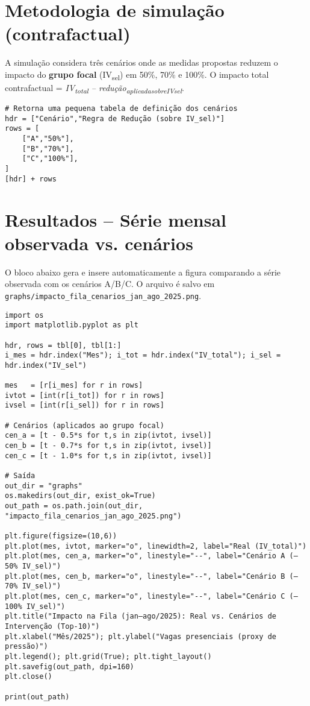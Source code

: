\documentclass[11pt]{article}
\begin{document}
\section{Metodologia de simulação (contrafactual)}
\label{sec:org0a66654}
A simulação considera três cenários onde as medidas propostas reduzem o impacto do \textbf{grupo focal} (IV\textsubscript{sel}) em 50\%, 70\% e 100\%. O impacto total contrafactual = \emph{IV\textsubscript{total} – redução\textsubscript{aplicada}\textsubscript{sobre}\textsubscript{IV}\textsubscript{sel}}.

\begin{verbatim}
# Retorna uma pequena tabela de definição dos cenários
hdr = ["Cenário","Regra de Redução (sobre IV_sel)"]
rows = [
    ["A","50%"],
    ["B","70%"],
    ["C","100%"],
]
[hdr] + rows
\end{verbatim}

\section{Resultados – Série mensal observada vs. cenários}
\label{sec:org89fda5d}
O bloco abaixo gera e insere automaticamente a figura comparando a série observada com os cenários A/B/C. O arquivo é salvo em \texttt{graphs/impacto\_fila\_cenarios\_jan\_ago\_2025.png}.

\begin{verbatim}
import os
import matplotlib.pyplot as plt

hdr, rows = tbl[0], tbl[1:]
i_mes = hdr.index("Mes"); i_tot = hdr.index("IV_total"); i_sel = hdr.index("IV_sel")

mes   = [r[i_mes] for r in rows]
ivtot = [int(r[i_tot]) for r in rows]
ivsel = [int(r[i_sel]) for r in rows]

# Cenários (aplicados ao grupo focal)
cen_a = [t - 0.5*s for t,s in zip(ivtot, ivsel)]
cen_b = [t - 0.7*s for t,s in zip(ivtot, ivsel)]
cen_c = [t - 1.0*s for t,s in zip(ivtot, ivsel)]

# Saída
out_dir = "graphs"
os.makedirs(out_dir, exist_ok=True)
out_path = os.path.join(out_dir, "impacto_fila_cenarios_jan_ago_2025.png")

plt.figure(figsize=(10,6))
plt.plot(mes, ivtot, marker="o", linewidth=2, label="Real (IV_total)")
plt.plot(mes, cen_a, marker="o", linestyle="--", label="Cenário A (–50% IV_sel)")
plt.plot(mes, cen_b, marker="o", linestyle="--", label="Cenário B (–70% IV_sel)")
plt.plot(mes, cen_c, marker="o", linestyle="--", label="Cenário C (–100% IV_sel)")
plt.title("Impacto na Fila (jan–ago/2025): Real vs. Cenários de Intervenção (Top-10)")
plt.xlabel("Mês/2025"); plt.ylabel("Vagas presenciais (proxy de pressão)")
plt.legend(); plt.grid(True); plt.tight_layout()
plt.savefig(out_path, dpi=160)
plt.close()

print(out_path)
\end{verbatim}
\end{document}
